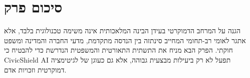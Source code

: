 \section{סיכום פרק}
\label{sec:vision_summary}

הגנה על המרחב הדמוקרטי בעידן הבינה המלאכותית אינה משימה טכנולוגית בלבד, אלא אתגר לאומי רב-תחומי המחייב סינתזה בין הנדסה מתקדמת, מדעי החברה והמדינה ומשפט חוקתי. הפרק הבא מניח את התשתית התאורטית והמשפטית הנדרשת כדי להבטיח כי \textenglish{CivicShield AI} תפעל לא רק ביעילות מבצעית גבוהה, אלא גם כעוגן של לגיטימציה דמוקרטית וזכויות אדם.
